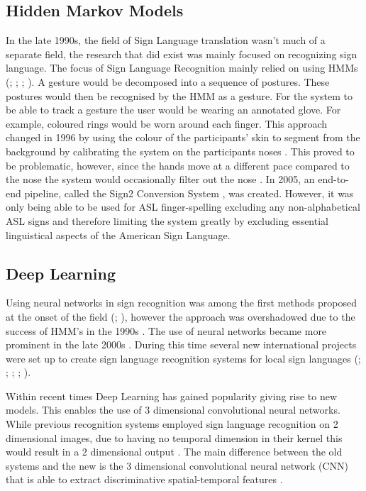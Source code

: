 \subsection{Hidden Markov Models}
In the late 1990s, the field of Sign Language translation wasn't much of a separate field, the research that did exist was mainly focused on recognizing sign language. The focus of Sign Language Recognition mainly relied on using HMMs (\citealp{hiddenmarkov1l}; \citealp{hiddenmarkov2}; \citealp{hiddenmarkov3}; \citealp{holden2005australian}). A gesture would be decomposed into a sequence of postures. These postures would then be recognised by the HMM as a gesture. For the system to be able to track a gesture the user would be wearing an annotated glove. For example, coloured rings would be worn around each finger. This approach changed in 1996 by using the colour of the participants' skin to segment from the background by calibrating the system on the participants noses \cite{starner1998real}. This proved to be problematic, however, since the hands move at a different pace compared to the nose the system would occasionally filter out the nose \cite{starner1998real}. In 2005, an end-to-end pipeline, called the Sign2 Conversion System \cite{glenn2005image}, was created. However, it was only being able to be used for ASL finger-spelling excluding any non-alphabetical ASL signs and therefore limiting the system greatly by excluding essential linguistical aspects of the American Sign Language.

\subsection{Deep Learning}

Using neural networks in sign recognition was among the first methods proposed at the onset of the field (\citealp{murakami1991gesture}; \citealp{fels1993glove}), however the approach was overshadowed due to the success of HMM's in the 1990s \cite{cooper2011sign}. The use of neural networks became more prominent in the late 2000s \cite{parton2006sign}. During this time several new international projects were set up to create sign language recognition systems for local sign languages (\citealp{ethopia}; \citealp{malaysia}; \citealp{persia}; \citealp{brazil}; \citealp{arabia}). 

Within recent times Deep Learning \cite{lecun2015deep} has gained popularity giving rise to new models. This enables the use of 3 dimensional convolutional neural networks. While previous recognition systems employed sign language recognition on 2 dimensional images, due to having no temporal dimension in their kernel this would result in a 2 dimensional output \cite{tran2015learning}. The main difference between the old systems and the new is the 3 dimensional convolutional neural network (CNN) that is able to extract discriminative spatial-temporal features \cite{huang2015sign}.

